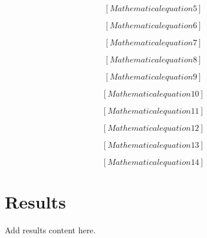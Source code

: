 \documentclass[12pt]{article}
\begin{document}
\begin{equation}
\label{eq:form_5}
[Mathematical equation 5]
\end{equation}

\begin{equation}
\label{eq:form_6}
[Mathematical equation 6]
\end{equation}

\begin{equation}
\label{eq:form_7}
[Mathematical equation 7]
\end{equation}

\begin{equation}
\label{eq:form_8}
[Mathematical equation 8]
\end{equation}

\begin{equation}
\label{eq:form_9}
[Mathematical equation 9]
\end{equation}

\begin{equation}
\label{eq:form_10}
[Mathematical equation 10]
\end{equation}

\begin{equation}
\label{eq:form_11}
[Mathematical equation 11]
\end{equation}

\begin{equation}
\label{eq:form_12}
[Mathematical equation 12]
\end{equation}

\begin{equation}
\label{eq:form_13}
[Mathematical equation 13]
\end{equation}

\begin{equation}
\label{eq:form_14}
[Mathematical equation 14]
\end{equation}



\section{Results}
\label{sec:results}

Add results content here.
\end{document}
